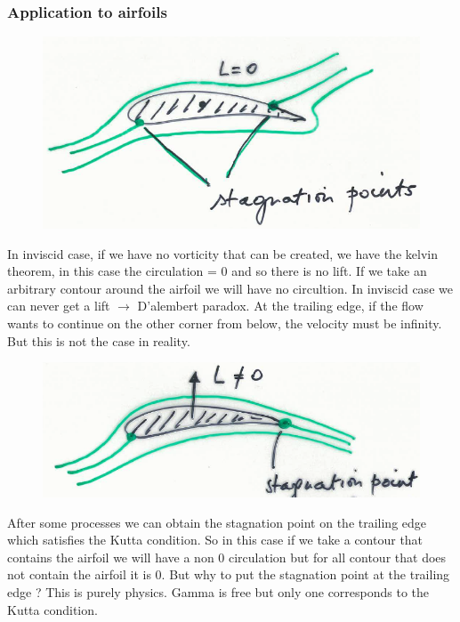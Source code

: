 	\subsubsection{Application to airfoils}
		\begin{figure}
		\vspace{-5mm}
		\includegraphics[scale=0.35]{ch1/3}
		\end{figure}
		In inviscid case, if we have no vorticity that can be created, we have the kelvin theorem, in this case the circulation = 0 and so there is no lift. If we take an arbitrary contour around the airfoil we will have no circultion. In inviscid case we can never get a lift $\rightarrow$ D’alembert paradox. At the trailing edge, if the flow wants to continue on the other corner from below, the velocity must be infinity. But this is not the case in reality. \\

		\begin{figure}
		\vspace{-5mm}
		\includegraphics[scale=0.35]{ch1/4}
		\end{figure}
		After some processes we can obtain the stagnation point on the trailing edge which satisfies the Kutta condition. So in this case if we take a contour that contains the airfoil we will have a non 0 circulation but for all contour that does not contain the airfoil it is 0. But why to put the stagnation point at the trailing edge ? This is purely physics. Gamma is free but only one corresponds to the Kutta condition. \\
		

